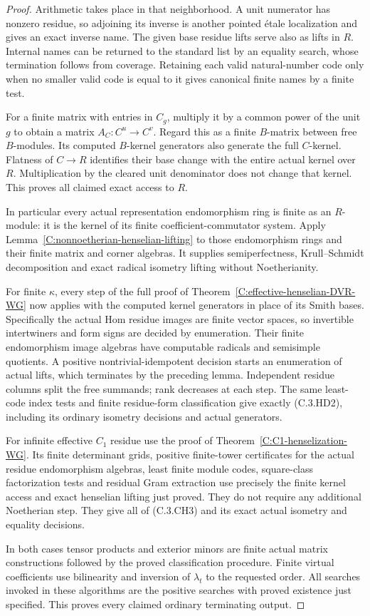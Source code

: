 \begin{proof}
Arithmetic takes place in that
neighborhood.  A unit numerator
has nonzero residue, so adjoining
its inverse is another pointed
\'etale localization and gives
an exact inverse name.
The given base residue lifts
serve also as lifts in $R$.
Internal names can be returned
to the standard list by an
equality search, whose termination
follows from coverage.
Retaining each valid natural-number
code only when no smaller valid
code is equal to it gives canonical
finite names by a finite test.

For a finite matrix with entries
in $C_g$, multiply it by a common
power of the unit $g$ to obtain
a matrix $A_C:C^u\to C^v$.
Regard this as a finite $B$-matrix
between free $B$-modules.
Its computed $B$-kernel generators
also generate the full $C$-kernel.
Flatness of $C\to R$ identifies
their base change with the entire
actual kernel over $R$.
Multiplication by the cleared
unit denominator does not change
that kernel.  This proves all
claimed exact access to $R$.

In particular every actual
representation endomorphism ring
is finite as an $R$-module:
it is the kernel of its finite
coefficient-commutator system.
Apply Lemma~\ref{C:nonnoetherian-henselian-lifting}
to those endomorphism rings
and their finite matrix and
corner algebras.
It supplies semiperfectness,
Krull--Schmidt decomposition
and exact radical isometry
lifting without Noetherianity.

For finite $\kappa$, every
step of the full proof of
Theorem~\ref{C:effective-henselian-DVR-WG}
now applies with the computed
kernel generators in place
of its Smith bases.
Specifically the actual Hom
residue images are finite
vector spaces, so invertible
intertwiners and form signs
are decided by enumeration.
Their finite endomorphism
image algebras have computable
radicals and semisimple
quotients.  A positive
nontrivial-idempotent decision
starts an enumeration of
actual lifts, which terminates
by the preceding lemma.
Independent residue columns
split the free summands;
rank decreases at each step.
The same least-code index
tests and finite residue-form
classification give exactly
(C.3.HD2), including its
ordinary isometry decisions
and actual generators.

For infinite effective $C_1$
residue use the proof of
Theorem~\ref{C:C1-henselization-WG}.
Its finite determinant grids,
positive finite-tower certificates
for the actual residue
endomorphism algebras, least
finite module codes, square-class
factorization tests and
residual Gram extraction
use precisely the finite
kernel access and exact
henselian lifting just proved.
They do not require any
additional Noetherian step.
They give all of (C.3.CH3)
and its exact actual isometry
and equality decisions.

In both cases tensor products
and exterior minors are finite
actual matrix constructions
followed by the proved
classification procedure.
Finite virtual coefficients
use bilinearity and inversion
of $\lambda_t$ to the requested
order.  All searches invoked
in these algorithms are the
positive searches with proved
existence just specified.
This proves every claimed
ordinary terminating output.
\end{proof}

